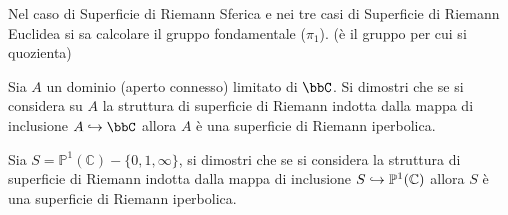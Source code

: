 \begin{osservazione}
Nel caso di Superficie di Riemann Sferica e nei tre casi di Superficie di Riemann Euclidea si sa calcolare il gruppo fondamentale ($\pi_1$). (è il gruppo per cui si quozienta)
\end{osservazione}

\begin{esercizio}
Sia $A$ un dominio (aperto connesso) limitato di $\bbC$. Si dimostri che se si considera su $A$ la struttura di superficie di Riemann indotta dalla mappa di inclusione $A\hrar\bbC$ allora $A$ è una superficie di Riemann iperbolica.
\end{esercizio}



\begin{esercizio}Sia $S=\mathbb{P}^1(\mathbb{C})\minus\{0,1,\infty\}$, si dimostri che se si considera la struttura di superficie di Riemann indotta dalla mappa di inclusione $S\hookrightarrow\mathbb{P}^1(\mathbb{C})$ allora $S$ è una superficie di Riemann iperbolica.
\end{esercizio}


